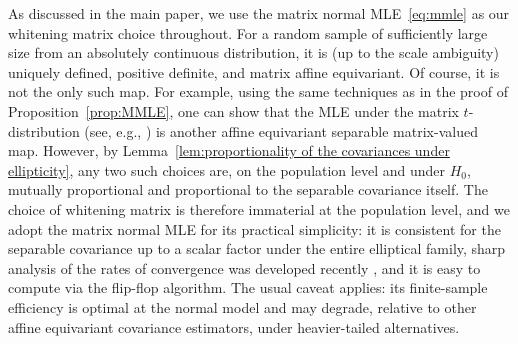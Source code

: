 \documentclass[12pt]{article}
\begin{document}
As discussed in the main paper, we use the matrix normal MLE~\eqref{eq:mmle} as our whitening matrix choice throughout. For a random sample of sufficiently large size from an absolutely continuous distribution, it is (up to the scale ambiguity) uniquely defined, positive definite, and matrix affine equivariant. Of course, it is not the only such map. For example, using the same techniques as in the proof of Proposition~\ref{prop:MMLE}, one can show that the MLE under the matrix $t$-distribution (see, e.g., \cite{gupta1994new}) is another affine equivariant separable matrix-valued map. However, by Lemma~\ref{lem:proportionality of the covariances under ellipticity}, any two such choices are, on the population level and under $H_0$, mutually proportional and proportional to the separable covariance itself. The choice of whitening matrix is therefore immaterial at the population level, and we adopt the matrix normal MLE for its practical simplicity: it is consistent for the separable covariance up to a scalar factor under the entire elliptical family, sharp analysis of the rates of convergence was developed recently \citep{franks2026near}, and it is easy to compute via the flip-flop algorithm. The usual caveat applies: its finite-sample efficiency is optimal at the normal model and may degrade, relative to other affine equivariant covariance estimators, under heavier-tailed alternatives.
\end{document}
